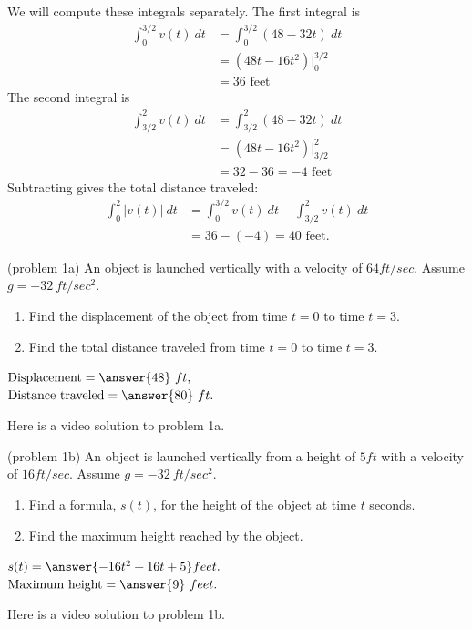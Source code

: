 \documentclass[handout]{ximera}
\begin{document}
\begin{example}[example 1]
We will compute these integrals separately. The first integral is
\begin{align*}
\int_0^{3/2} v(t) \ dt & = \int_0^{3/2}(48 - 32t) \ dt \\
 & = (48t - 16t^2)\bigg|_0^{3/2} \\
 & = 36 \text{ feet}
\end{align*}
The second integral is
\begin{align*}
\int_{3/2}^2 v(t) \ dt & = \int_{3/2}^2(48 - 32t) \ dt \\
 & = (48t - 16t^2)\bigg|_{3/2}^2 \\
 & = 32 - 36 = -4 \text{ feet}
\end{align*}
Subtracting gives the total distance traveled:
\begin{align*}
\int_0^2 |v(t)| \ dt & = \int_0^{3/2} v(t) \ dt - \int_{3/2}^2 v(t) \ dt \\
 & = 36 - (-4) = 40 \text{ feet}.
\end{align*}

\end{example}



\begin{problem}(problem 1a)
An object is launched vertically with a velocity of $64 ft/sec$. Assume $g = -32 \ ft/sec^2$.\\
\begin{enumerate}
\item Find the displacement of the object from time $t = 0$ to time $t = 3$.
\item Find the total distance traveled from time $t = 0$ to time $t = 3$.
\end{enumerate}

$\text{Displacement} =\answer{48} \ ft,$\\
$\text{Distance traveled} = \answer{80} \ ft.$
\end{problem}

Here is a video solution to problem 1a.
\begin{foldable}
\end{foldable}

\begin{problem}(problem 1b)
An object is launched vertically from a height of $5 ft$ with a velocity of $16 ft/sec$. Assume $g = -32 \ ft/sec^2$.\\ 
\begin{enumerate}
\item Find a formula, $s(t)$, for the height of the object at time $t$
 seconds.
\item Find the maximum height reached by the object.
\end{enumerate}

$s(t) = \answer{-16t^2 + 16t + 5} feet.$\\
$\text{Maximum height} =\answer{9} \ feet.$

\end{problem}

Here is a video solution to problem 1b.
\begin{foldable}
\end{foldable}
\end{document}

